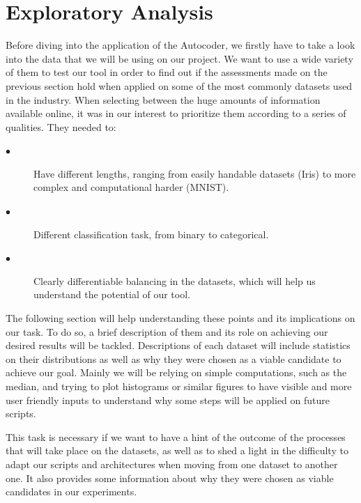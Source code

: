 \label{chap:Develop}
\section{Exploratory Analysis}

Before diving into the application of the Autocoder, we firstly have to take a look into the data that we will be using on our project. We want to use a wide variety of them to test our tool in order to find out if the assessments made on the previous section hold when applied on some of the most commonly datasets used in the industry. When selecting between the huge amounts of information available online, it was in our interest to prioritize them according to a series of qualities. They needed to:
 
\begin{description}
	
\item[$\bullet$] Have different lengths, ranging from easily handable datasets (Iris) to more complex and computational harder (MNIST).

\item[$\bullet$] Different classification task, from binary to categorical.

\item[$\bullet$] Clearly differentiable balancing in the datasets, which will help us understand the potential of our tool.

\end{description}

The following section will help understanding these points and its implications on our task. To do so, a brief description of them and its role on achieving our desired results will be tackled. Descriptions of each dataset will include statistics on their distributions as well as why they were chosen as a viable candidate to achieve our goal. Mainly we will be relying on simple computations, such as the median, and trying to plot histograms or similar figures to have visible and more user friendly inputs to understand why some steps will be applied on future scripts.\par
 
This task is necessary if we want to have a hint of the outcome of the processes that will take place on the datasets, as well as to shed a light in the difficulty to adapt our scripts and architectures when moving from one dataset to another one. It also provides some information about why they were chosen as viable candidates in our experiments.

